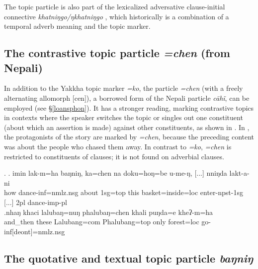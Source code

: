 The topic particle is also part of the lexicalized adversative clause-initial connective \emph{khatniŋgo/ŋkhatniŋgo} , which historically is a combination of a temporal adverb meaning  and the topic marker.

\subsection{The contrastive topic particle \emph{=chen} (from Nepali)}

In addition to the Yakkha topic marker \emph{=ko}, the particle \emph{=chen} (with a freely alternating allomorph  [cen]), a borrowed form of  the Nepali particle \emph{cāhĩ}, can be employed (see §\ref{loansphon}).  It has a stronger reading, marking contrastive topics  in contexts where the speaker switches the topic or singles out one constituent (about which an assertion is made) against other constituents, as shown in \Next[a]. In \Next[b], the protagonists of the story are marked by \emph{=chen}, because the preceding content was about the people who chased them away.
In contrast to \emph{=ko},  \emph{=chen} is restricted to constituents of clauses; it is not found on adverbial clauses. 

\ex. \ag. imin lak-m=ha baŋniŋ, ka=chen  na doku=hoŋ=be        u-me-ŋ, [...] nniŋda lakt-a-ni\\
how dance{\sc -inf=nmlz.nsg} about {\sc 1sg=top} this basket{\sc =inside=loc} enter{\sc -npst-1sg} [...] {\sc 2pl} dance{\sc -imp-pl}\\
\bg.nhaŋ khaci     lalubaŋ=nuŋ   phalubaŋ=chen khali puŋda=e     kheʔ-m=ha\\
and\_then these Lalubang{\sc =com} Phalubang{\sc =top} only forest{\sc =loc} go{\sc -inf[deont]=nmlz.nsg}\\
 
\subsection{The quotative and textual topic particle \emph{baŋniŋ}}
	
